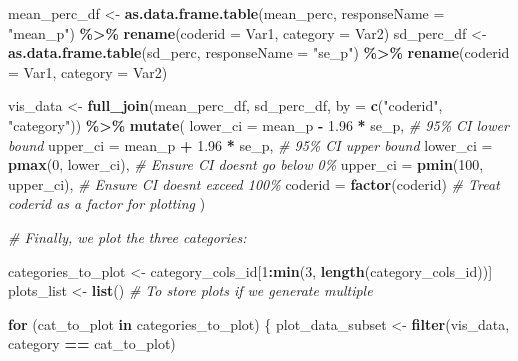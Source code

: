 \documentclass[
]{book}
\newenvironment{Shaded}{\begin{snugshade}}{\end{snugshade}}
\newcommand{\AttributeTok}[1]{\textcolor[rgb]{0.13,0.29,0.53}{#1}}
\newcommand{\CommentTok}[1]{\textcolor[rgb]{0.56,0.35,0.01}{\textit{#1}}}
\newcommand{\ControlFlowTok}[1]{\textcolor[rgb]{0.13,0.29,0.53}{\textbf{#1}}}
\newcommand{\DecValTok}[1]{\textcolor[rgb]{0.00,0.00,0.81}{#1}}
\newcommand{\FloatTok}[1]{\textcolor[rgb]{0.00,0.00,0.81}{#1}}
\newcommand{\FunctionTok}[1]{\textcolor[rgb]{0.13,0.29,0.53}{\textbf{#1}}}
\newcommand{\NormalTok}[1]{#1}
\newcommand{\OtherTok}[1]{\textcolor[rgb]{0.56,0.35,0.01}{#1}}
\newcommand{\SpecialCharTok}[1]{\textcolor[rgb]{0.81,0.36,0.00}{\textbf{#1}}}
\newcommand{\StringTok}[1]{\textcolor[rgb]{0.31,0.60,0.02}{#1}}
\begin{document}
\begin{Shaded}
\begin{Highlighting}[]
\NormalTok{mean\_perc\_df }\OtherTok{\textless{}{-}} \FunctionTok{as.data.frame.table}\NormalTok{(mean\_perc, }\AttributeTok{responseName =} \StringTok{"mean\_p"}\NormalTok{) }\SpecialCharTok{\%\textgreater{}\%}
  \FunctionTok{rename}\NormalTok{(}\AttributeTok{coderid =}\NormalTok{ Var1, }\AttributeTok{category =}\NormalTok{ Var2)}
\NormalTok{sd\_perc\_df }\OtherTok{\textless{}{-}} \FunctionTok{as.data.frame.table}\NormalTok{(sd\_perc, }\AttributeTok{responseName =} \StringTok{"se\_p"}\NormalTok{) }\SpecialCharTok{\%\textgreater{}\%}
  \FunctionTok{rename}\NormalTok{(}\AttributeTok{coderid =}\NormalTok{ Var1, }\AttributeTok{category =}\NormalTok{ Var2)}

\NormalTok{vis\_data }\OtherTok{\textless{}{-}} \FunctionTok{full\_join}\NormalTok{(mean\_perc\_df, sd\_perc\_df, }\AttributeTok{by =} \FunctionTok{c}\NormalTok{(}\StringTok{"coderid"}\NormalTok{, }\StringTok{"category"}\NormalTok{)) }\SpecialCharTok{\%\textgreater{}\%}
  \FunctionTok{mutate}\NormalTok{(}
    \AttributeTok{lower\_ci =}\NormalTok{ mean\_p }\SpecialCharTok{{-}} \FloatTok{1.96} \SpecialCharTok{*}\NormalTok{ se\_p, }\CommentTok{\# 95\% CI lower bound}
    \AttributeTok{upper\_ci =}\NormalTok{ mean\_p }\SpecialCharTok{+} \FloatTok{1.96} \SpecialCharTok{*}\NormalTok{ se\_p, }\CommentTok{\# 95\% CI upper bound}
    \AttributeTok{lower\_ci =} \FunctionTok{pmax}\NormalTok{(}\DecValTok{0}\NormalTok{, lower\_ci), }\CommentTok{\# Ensure CI doesn\textquotesingle{}t go below 0\%}
    \AttributeTok{upper\_ci =} \FunctionTok{pmin}\NormalTok{(}\DecValTok{100}\NormalTok{, upper\_ci), }\CommentTok{\# Ensure CI doesn\textquotesingle{}t exceed 100\%}
    \AttributeTok{coderid =} \FunctionTok{factor}\NormalTok{(coderid)        }\CommentTok{\# Treat coderid as a factor for plotting}
\NormalTok{  )}

\CommentTok{\# Finally, we plot the three categories:}

\NormalTok{categories\_to\_plot }\OtherTok{\textless{}{-}}\NormalTok{ category\_cols\_id[}\DecValTok{1}\SpecialCharTok{:}\FunctionTok{min}\NormalTok{(}\DecValTok{3}\NormalTok{, }\FunctionTok{length}\NormalTok{(category\_cols\_id))]}
\NormalTok{plots\_list }\OtherTok{\textless{}{-}} \FunctionTok{list}\NormalTok{() }\CommentTok{\# To store plots if we generate multiple}

\ControlFlowTok{for}\NormalTok{ (cat\_to\_plot }\ControlFlowTok{in}\NormalTok{ categories\_to\_plot) \{}
\NormalTok{  plot\_data\_subset }\OtherTok{\textless{}{-}} \FunctionTok{filter}\NormalTok{(vis\_data, category }\SpecialCharTok{==}\NormalTok{ cat\_to\_plot)}
  

\end{Highlighting}
\end{Shaded}
\end{document}
